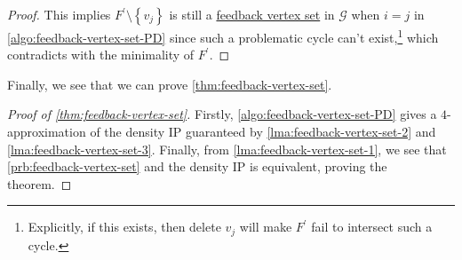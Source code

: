 \begin{proof}
	This implies \(F^\prime \setminus \left\{ v_j \right\} \) is still a \hyperref[prb:feedback-vertex-set]{feedback vertex set} in \(\mathcal{G} \) when \(i = j\) in \autoref{algo:feedback-vertex-set-PD} since such a problematic cycle can't exist,\footnote{Explicitly, if this exists, then delete \(v_j\) will make \(F^\prime\) fail to intersect such a cycle.} which contradicts with the minimality of \(F^\prime\).
\end{proof}

Finally, we see that we can prove \autoref{thm:feedback-vertex-set}.

\begin{proof}[Proof of \autoref{thm:feedback-vertex-set}]
	Firstly, \autoref{algo:feedback-vertex-set-PD} gives a \(4\)-approximation of the density IP guaranteed by \autoref{lma:feedback-vertex-set-2} and \autoref{lma:feedback-vertex-set-3}. Finally, from \autoref{lma:feedback-vertex-set-1}, we see that \autoref{prb:feedback-vertex-set} and the density IP is equivalent, proving the theorem.
\end{proof}